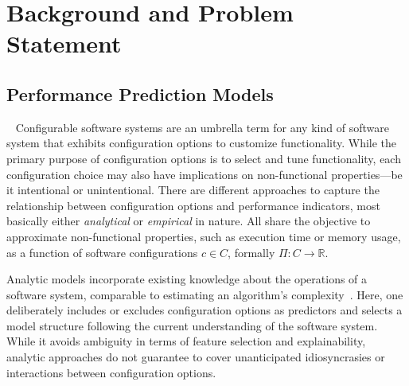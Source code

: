 \section{Background and Problem Statement}
\subsection{Performance Prediction Models}~\label{sec:perfmodels}
Configurable software systems are an umbrella term for any kind of software system that exhibits configuration options to customize functionality. While the primary purpose of configuration options is to select and tune functionality, each configuration choice may also have implications on non-functional properties---be it intentional or unintentional. 
There are different approaches to capture the relationship between configuration options and performance indicators, most basically either \textit{analytical} or \textit{empirical} in nature. All share the objective to approximate non-functional properties, such as execution time or memory usage, as a function of software configurations  $c \in C$, formally $\Pi: C \rightarrow \mathbb{R}$. 

Analytic models incorporate existing knowledge about the operations of a software system, comparable to estimating an algorithm’s complexity~\cite{analytic_model_2000,analytic_model_2011}. Here, one deliberately includes or excludes configuration options as predictors and selects a model structure following the current understanding of the software system. While it avoids ambiguity in terms of feature selection and explainability, analytic approaches do not guarantee to cover unanticipated idiosyncrasies or interactions between configuration options.

